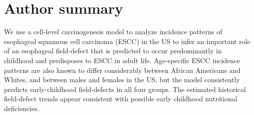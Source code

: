 \documentclass[10pt,letterpaper]{article}
\begin{document}

\section*{Author summary}
We use a cell-level carcinogenesis model to analyze incidence patterns of esophageal squamous cell carcinoma (ESCC) in the US to infer an important role of an esophageal field-defect that is predicted to occur predominantly in childhood and predisposes to ESCC in adult life. Age-specific ESCC incidence patterns are also known to differ considerably between African Americans and Whites, and between males and females in the US, but the model consistently predicts early-childhood field-defects in all four groups. The estimated historical field-defect trends appear consistent with possible early childhood nutritional deficiencies.
\end{document}
